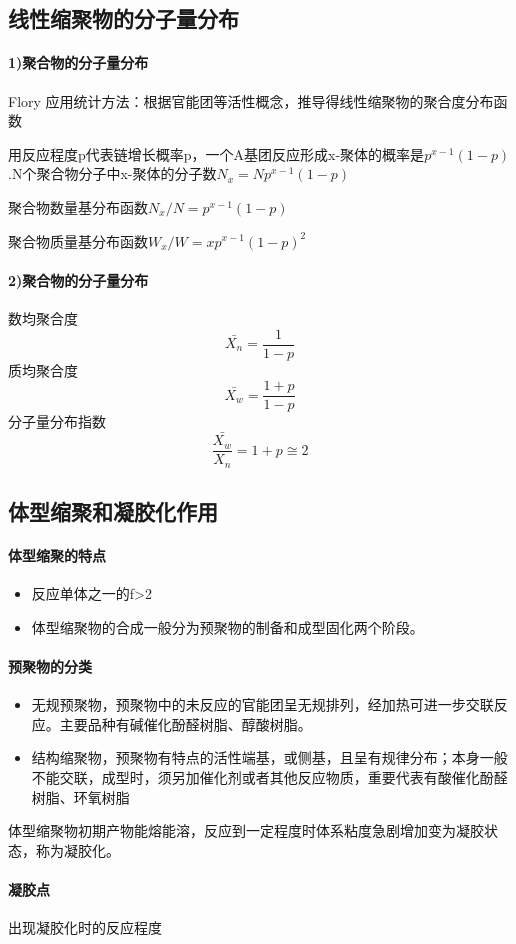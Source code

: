 ﻿\documentclass[12pt,a4paper]{article}
\begin{document}
\subsection{线性缩聚物的分子量分布}
\paragraph{1)聚合物的分子量分布}
Flory 应用统计方法：根据官能团等活性概念，推导得线性缩聚物的聚合度分布函数

用反应程度p代表链增长概率p，一个A基团反应形成x-聚体的概率是$p^{x-1}(1-p)$.N个聚合物分子中x-聚体的分子数$N_x=Np^{x-1}(1-p)$

聚合物数量基分布函数$N_x/N=p^{x-1}(1-p)$

聚合物质量基分布函数$W_x/W=xp^{x-1}(1-p)^2$
\paragraph{2)聚合物的分子量分布}
数均聚合度
$$\bar{X_n}=\frac{1}{1-p}$$
质均聚合度
$$\bar{X_w}=\frac{1+p}{1-p}$$
分子量分布指数
$$\frac{\bar{X_w}}{X_n}=1+p\cong 2$$
\subsection{体型缩聚和凝胶化作用}
\paragraph{体型缩聚的特点}
\begin{itemize}
  \item 反应单体之一的f>2
  \item 体型缩聚物的合成一般分为预聚物的制备和成型固化两个阶段。
\end{itemize} 
\paragraph{预聚物的分类}
\begin{itemize}
  \item 无规预聚物，预聚物中的未反应的官能团呈无规排列，经加热可进一步交联反应。主要品种有碱催化酚醛树脂、醇酸树脂。
  \item 结构缩聚物，预聚物有特点的活性端基，或侧基，且呈有规律分布；本身一般不能交联，成型时，须另加催化剂或者其他反应物质，重要代表有酸催化酚醛树脂、环氧树脂
\end{itemize} 
体型缩聚物初期产物能熔能溶，反应到一定程度时体系粘度急剧增加变为凝胶状态，称为凝胶化。
\paragraph{凝胶点}出现凝胶化时的反应程度
\end{document}
